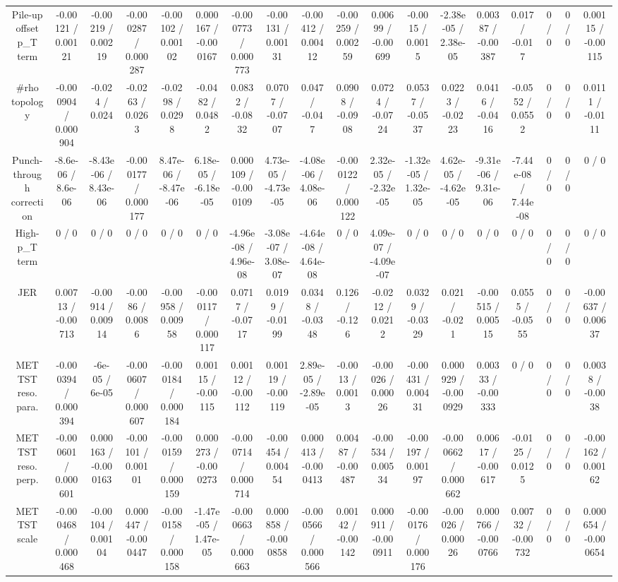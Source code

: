\documentclass[10pt]{article}
\begin{document}
\begin{table}[htbp]
\begin{center}
\begin{tabular}{|c|c|c|c|c|c|c|c|c|c|c|c|c|c|c|c|c|c|}
  Pile-up offset p_{T} term & -0.00121 / 0.00121 & -0.00219 / 0.00219 & -0.000287 / 0.000287 & -0.00102 / 0.00102 & 0.000167 / -0.000167 & -0.000773 / 0.000773 & -0.00131 / 0.00131 & -0.00412 / 0.00412 & -0.00259 / 0.00259 & 0.00699 / -0.00699 & -0.0015 / 0.0015 & -2.38e-05 / 2.38e-05 & 0.00387 / -0.00387 & 0.017 / -0.017 & 0 / 0 & 0 / 0 & 0.00115 / -0.00115 \\ 
  #rho topology & -0.000904 / 0.000904 & -0.024 / 0.024 & -0.0263 / 0.0263 & -0.0298 / 0.0298 & -0.0482 / 0.0482 & 0.0832 / -0.0832 & 0.0707 / -0.0707 & 0.047 / -0.047 & 0.0908 / -0.0908 & 0.0724 / -0.0724 & 0.0537 / -0.0537 & 0.0223 / -0.0223 & 0.0416 / -0.0416 & -0.0552 / 0.0552 & 0 / 0 & 0 / 0 & 0.0111 / -0.0111 \\ 
  Punch-through correction & -8.6e-06 / 8.6e-06 & -8.43e-06 / 8.43e-06 & -0.000177 / 0.000177 & 8.47e-06 / -8.47e-06 & 6.18e-05 / -6.18e-05 & 0.000109 / -0.000109 & 4.73e-05 / -4.73e-05 & -4.08e-06 / 4.08e-06 & -0.000122 / 0.000122 & 2.32e-05 / -2.32e-05 & -1.32e-05 / 1.32e-05 & 4.62e-05 / -4.62e-05 & -9.31e-06 / 9.31e-06 & -7.44e-08 / 7.44e-08 & 0 / 0 & 0 / 0 & 0 / 0 \\ 
  High-p_{T} term & 0 / 0 & 0 / 0 & 0 / 0 & 0 / 0 & 0 / 0 & -4.96e-08 / 4.96e-08 & -3.08e-07 / 3.08e-07 & -4.64e-08 / 4.64e-08 & 0 / 0 & 4.09e-07 / -4.09e-07 & 0 / 0 & 0 / 0 & 0 / 0 & 0 / 0 & 0 / 0 & 0 / 0 & 0 / 0 \\ 
  JER & 0.00713 / -0.00713 & -0.00914 / 0.00914 & -0.0086 / 0.0086 & -0.00958 / 0.00958 & -0.000117 / 0.000117 & 0.0717 / -0.0717 & 0.0199 / -0.0199 & 0.0348 / -0.0348 & 0.126 / -0.126 & -0.0212 / 0.0212 & 0.0329 / -0.0329 & 0.021 / -0.021 & -0.00515 / 0.00515 & 0.0555 / -0.0555 & 0 / 0 & 0 / 0 & -0.00637 / 0.00637 \\ 
  MET TST reso. para. & -0.000394 / 0.000394 & -6e-05 / 6e-05 & -0.000607 / 0.000607 & -0.000184 / 0.000184 & 0.00115 / -0.00115 & 0.00112 / -0.00112 & 0.00119 / -0.00119 & 2.89e-05 / -2.89e-05 & -0.0013 / 0.0013 & -0.00026 / 0.00026 & -0.00431 / 0.00431 & 0.000929 / -0.000929 & 0.00333 / -0.00333 & 0 / 0 & 0 / 0 & 0 / 0 & 0.0038 / -0.0038 \\ 
  MET TST reso. perp. & -0.000601 / 0.000601 & 0.000163 / -0.000163 & -0.00101 / 0.00101 & -0.000159 / 0.000159 & 0.000273 / -0.000273 & -0.000714 / 0.000714 & -0.00454 / 0.00454 & 0.000413 / -0.000413 & 0.00487 / -0.00487 & -0.00534 / 0.00534 & -0.00197 / 0.00197 & -0.000662 / 0.000662 & 0.00617 / -0.00617 & -0.0125 / 0.0125 & 0 / 0 & 0 / 0 & -0.00162 / 0.00162 \\ 
  MET TST scale & -0.000468 / 0.000468 & -0.00104 / 0.00104 & 0.000447 / -0.000447 & -0.000158 / 0.000158 & -1.47e-05 / 1.47e-05 & -0.000663 / 0.000663 & 0.000858 / -0.000858 & -0.000566 / 0.000566 & 0.00142 / -0.00142 & 0.000911 / -0.000911 & -0.000176 / 0.000176 & -0.00026 / 0.00026 & 0.000766 / -0.000766 & 0.00732 / -0.00732 & 0 / 0 & 0 / 0 & 0.000654 / -0.000654 \\ 

\end{tabular}
\end{center}
\end{table}
\end{document}
